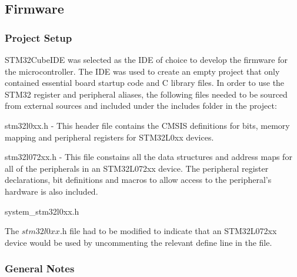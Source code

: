 \subsection{Firmware}

\subsubsection{Project Setup}

STM32CubeIDE was selected as the IDE of choice to develop the firmware for the microcontroller. The IDE was used to create an empty project that only contained essential board startup code and C library files. In order to use the STM32 register and peripheral aliases, the following files needed to be sourced from external sources and included under the includes folder in the project:

\begin{compactitem}
	\item stm32l0xx.h - This header file contains the \ac{CMSIS} definitions for bits, memory mapping and peripheral registers for STM32L0xx devices.
	\item stm32l072xx.h - This file constains all the data structures and address maps for all of the peripherals in an STM32L072xx device. The peripheral register declarations, bit definitions and macros to allow access to the peripheral's hardware is also included.
	\item system\_stm32l0xx.h
\end{compactitem}

The $\textit{stm32l0xx.h}$ file had to be modified to indicate that an STM32L072xx device would be used by uncommenting the relevant define line in the file.

\subsubsection{General Notes}


